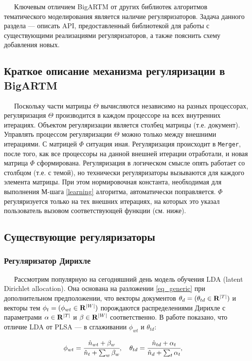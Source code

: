 
$\quad\;\:$Ключевым отличием BigARTM от других библиотек алгоритмов тематического моделирования является наличие регуляризаторов. Задача данного раздела --- описать API, предоставленный библиотекой для работы с существующими реализациями регуляризаторов, а также пояснить схему добавления новых.

\subsection{Краткое описание механизма регуляризации в BigARTM}
$\quad\;\:$Поскольку части матрицы $\Theta$ вычисляются независимо на разных процессорах, регуляризация $\Theta$ производится в каждом процессоре на всех внутренних итерациях. Объектом регуляризации является столбец матрицы (т.е. документ). Управлять процессом регуляризации $\Theta$ можно только между внешними итерациями. С матрицей $\Phi$ ситуация иная. Регуляризация происходит в \verb|Merger|, после того, как все процессоры на данной внешней итерации отработали, и новая матрица $\Phi$ сформирована. Регуляризация в логическом смысле опять работает со столбцом (т.е. с темой), но технически регуляризаторы вызываются для каждого элемента матрицы. При этом нормировочная константа, необходимая для выполнения М-шага \ref{learning} алгоритма, автоматически поправляется. $\Phi$ регуляризуется только на тех внешних итерациях, на которых это указал пользователь вызовом соответствующей функции (см. ниже). 

\subsection{Существующие регуляризаторы}

\subsubsection{Регуляризатор Дирихле}

$\quad\;\:$Рассмотрим популярную на сегодняшний день модель обучения LDA (latent Dirichlet allocation). Она основана на разложении \ref{eq_generic} при дополнительном предположении, что векторы документов $\theta_d = (\theta_{td} \in {\bf R}^{|T|})$ и векторы тем $\phi_t = (\phi_{wt} \in {\bf R}^{|W|})$ порождаются распределениями Дирихле с параметрами $\alpha \in {\bf R}^{|T|}$ и $\beta \in {\bf R}^{|W|}$ соответственно. В работе \cite{voron_potap_14} показано, что отличие LDA от PLSA --- в сглаживании $\phi_{wt}$ и $\theta_{td}$:

\begin{equation}
	\phi_{wt} = \cfrac{\hat n_{wt} + \beta_w}{\hat n_t + \sum_w \beta_w}, \quad 
 	\theta_{td} = \cfrac{\hat n_{td} + \alpha_t}{\hat n_d + \sum_t \alpha_t}, \quad
\end{equation}

